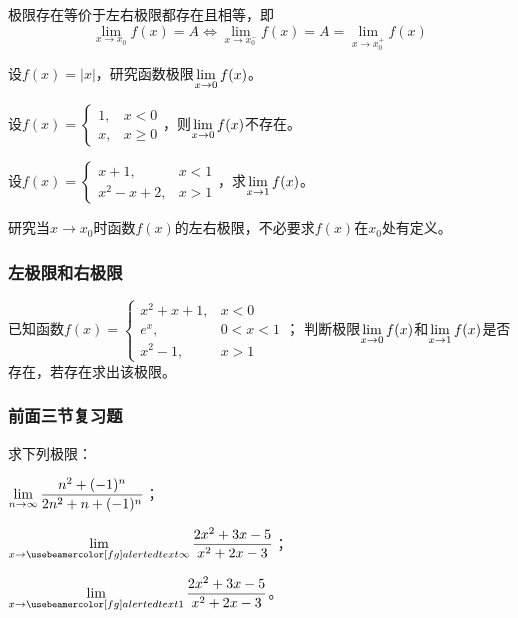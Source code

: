 \documentclass[14pt,notheorems,leqno,xcolor={rgb}]{beamer} %
\begin{document}
\begin{frame}
\begin{theorem}
极限存在等价于左右极限都存在且相等，即%
\[\lim_{x\to x_0}f(x)=A \Longleftrightarrow \lim_{x\to x_0^-}f(x)=A=\lim_{x\to x_0^+}f(x)\]
\end{theorem}
\vpause
\begin{example}
设$f(x)=|x|$，研究函数极限$\lim\limits_{x\to0}f(x)$。
\end{example}
\pause
\begin{example}
设$f(x)=\left\{\begin{array}{cc}1,&x<0\\x,&x\ge0\end{array}\right.$，则$\lim\limits_{x\to0}f(x)$不存在。
\end{example}
\pause
\begin{example}
设$f(x)=\left\{\begin{array}{ll}x+1,&x<1\\x^2-x+2,&x>1\end{array}\right.$，求$\lim\limits_{x\to1}f(x)$。
\end{example}
\vpause
\begin{remark*}
研究当$x\to x_0$时函数$f(x)$的左右极限，不必要求$f(x)$在$x_0$处有定义。
\end{remark*}
\end{frame}

\begin{frame}
\frametitle{左极限和右极限}
\begin{exercise}
已知函数$f(x)=\begin{cases}
x^2+x+1, & x<0 \\
e^x, & 0<x<1 \\
x^2-1, & x>1
\end{cases}$；
判断极限$\lim\limits_{x\to0}f(x)$和$\lim\limits_{x\to1}f(x)$是否存在，若存在求出该极限。
\end{exercise}
\end{frame}

\begin{frame}
\frametitle{前面三节复习题}
\begin{review}
求下列极限：
\begin{enumlite}
  \item $\lim\limits_{n\to\infty}\dfrac{n^2+(-1)^n}{2n^2+n+(-1)^n}$；
  \item $\limit_{x\to{\bm\infty}}\dfrac{2x^2+3x-5}{x^2+2x-3}$；
  \item $\limit_{x\to{\bm1}}\dfrac{2x^2+3x-5}{x^2+2x-3}$。
\end{enumlite}
\end{review}
\end{frame}
\end{document}
